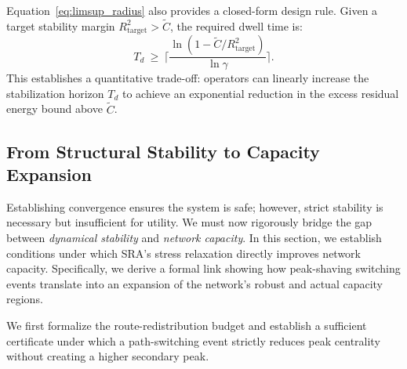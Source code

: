 \documentclass[journal]{IEEEtran}
\theoremstyle{plain}
\theoremstyle{definition}
\newcommand{\rev}[1]{{\color{blue}#1}}
\begin{document}
Equation~\eqref{eq:limsup_radius} also provides a closed-form design rule. Given a target stability margin $R_{\text{target}}^2 > \tilde C$, the required dwell time is:
\begin{equation}\label{eq:design_parameter_Td}
T_d\ \ge\ \Big\lceil \frac{\ln(1-\tilde C/R_{\text{target}}^2)}{\ln \gamma}\Big\rceil.
\end{equation}
This establishes a quantitative trade-off: operators can linearly increase the stabilization horizon $T_d$ to achieve an exponential reduction in the excess residual energy bound above $\tilde{C}$.

\subsection{From Structural Stability to Capacity Expansion}
\label{subsec:theory_bridge}

Establishing convergence ensures the system is safe; however, strict stability is necessary but insufficient for utility. 
We must now rigorously bridge the gap between \textit{dynamical stability} and \textit{network capacity}.
In this section, we establish conditions under which SRA's stress relaxation directly improves network capacity.
Specifically, we derive a formal link showing how peak-shaving switching events translate into an expansion of the network's robust and actual capacity regions.

\rev{We first formalize the route-redistribution budget and establish a sufficient certificate under which a path-switching event strictly reduces peak centrality without creating a higher secondary peak.}
\end{document}
